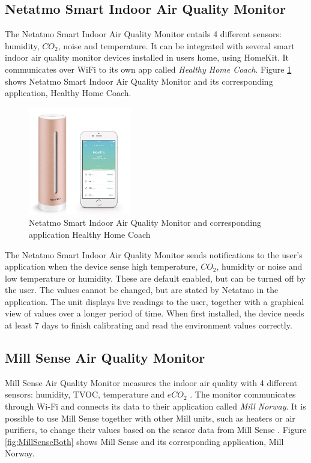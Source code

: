 \subsection{Netatmo Smart Indoor Air Quality Monitor}
The Netatmo Smart Indoor Air Quality Monitor entails 4 different sensors: humidity, \(CO_2\), noise and temperature. It can be integrated with several smart indoor air quality monitor devices installed in users home, using HomeKit. It communicates over WiFi to its own app called \textit{Healthy Home Coach}. Figure \ref{fig:Netatmo} shows Netatmo Smart Indoor Air Quality Monitor and its corresponding application, Healthy Home Coach. 
\begin{figure} [H]
    \centering
    \includegraphics[width=0.4\textwidth]{figures/Netatmo.png}
    \caption{Netatmo Smart Indoor Air Quality Monitor and corresponding application Healthy Home Coach \cite{NetatmoDevice}}
    \label{fig:Netatmo}
\end{figure}

The Netatmo Smart Indoor Air Quality Monitor sends notifications to the user's application when the device sense high temperature, \(CO_2\), humidity or noise and low temperature or humidity. These are default enabled, but can be turned off by the user. The values cannot be changed, but are stated by Netatmo in the application. The unit displays live readings to the user, together with a graphical view of values over a longer period of time. When first installed, the device needs at least 7 days to finish calibrating and read the environment values correctly. 

\subsection{Mill Sense Air Quality Monitor}
Mill Sense Air Quality Monitor measures the indoor air quality with 4 different sensors: humidity, \gls{TVOC}, temperature and \(eCO_2\) \cite{Mill}. The monitor communicates through Wi-Fi and connects its data to their application called \textit{Mill Norway}. It is possible to use Mill Sense together with other Mill units, such as heaters or air purifiers,  to change their values based on the sensor data from Mill Sense \cite{Mill}. Figure \ref{fig:MillSenseBoth} shows Mill Sense and its corresponding application, Mill Norway. 

